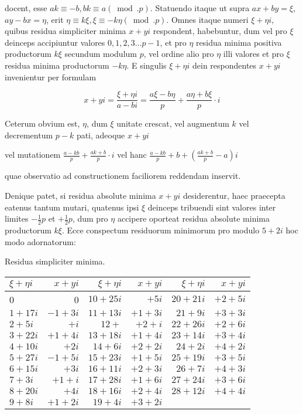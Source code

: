 \documentclass[10pt]{article}
\begin{document}
docent, esse \(a k \equiv-b, b k \equiv a(\bmod . p)\). Statuendo itaque ut supra \(a x+b y=\xi\),
\(a y-b x=\eta\), erit \(\eta \equiv k \xi, \xi \equiv-k \eta(\bmod . p)\). Omnes itaque numeri \(\xi+\eta i\), quibus residua simpliciter minima \(x+y i\) respondent, habebuntur, dum vel pro \(\xi\) deinceps accipiuntur valores \(0,1,2,3 \ldots p-1\), et pro \(\eta\) residua minima positiva productorum \(k \xi\) secundum modulum \(p\), vel ordine alio pro \(\eta\) illi valores et pro \(\xi\) residua minima productorum \(-k \eta\). E singulis \(\xi+\eta i\) dein respondentes \(x+y i\) invenientur per formulam

\[
x+y i=\frac{\xi+\eta i}{a-b i}=\frac{a \xi-b \eta}{p}+\frac{a \eta+b \xi}{p} \cdot i
\]

Ceterum obvium est, \(\eta\), dum \(\xi\) unitate crescat, vel augmentum \(k\) vel decrementum \(p-k\) pati, adeoque \(x+y i\)

vel mutationem \(\frac{a-k b}{p}+\frac{a k+b}{p} \cdot i\) vel hanc \(\frac{a-k b}{p}+b+\left(\frac{a k+b}{p}-a\right) i\)

quae observatio ad constructionem faciliorem reddendam inservit.

Denique patet, si residua absolute minima \(x+y i\) desiderentur, haec praecepta eatenus tantum mutari, quatenus ipsi \(\xi\) deinceps tribuendi sint valores inter limites \(-\frac{1}{2} p\) et \(+\frac{1}{2} p\), dum pro \(\eta\) accipere oporteat residua absolute minima productorum \(k \xi\). Ecce conspectum residuorum minimorum pro modulo \(5+2 i\) hoc modo adornatorum:

Residua simpliciter minima.

\begin{center}
\begin{tabular}{l|r|r|r|r|r}
\(\xi+\eta i\) & \(x+y i\) & \(\xi+\eta i\) & \(x+y i\) & \(\xi+\eta i\) & \(x+y i\) \\
\hline
0 & 0 & \(10+25 i\) & \(+5 i\) & \(20+21 i\) & \(+2+5 i\) \\
\(1+17 i\) & \(-1+3 i\) & \(11+13 i\) & \(+1+3 i\) & \(21+9 i\) & \(+3+3 i\) \\
\(2+5 i\) & \(+i\) & \(12+\) & \(+2+i\) & \(22+26 i\) & \(+2+6 i\) \\
\(3+22 i\) & \(+1+4 i\) & \(13+18 i\) & \(+1+4 i\) & \(23+14 i\) & \(+3+4 i\) \\
\(4+10 i\) & \(+2 i\) & \(14+6 i\) & \(+2+2 i\) & \(24+2 i\) & \(+4+2 i\) \\
\(5+27 i\) & \(-1+5 i\) & \(15+23 i\) & \(+1+5 i\) & \(25+19 i\) & \(+3+5 i\) \\
\(6+15 i\) & \(+3 i\) & \(16+11 i\) & \(+2+3 i\) & \(26+7 i\) & \(+4+3 i\) \\
\(7+3 i\) & \(+1+i\) & \(17+28 i\) & \(+1+6 i\) & \(27+24 i\) & \(+3+6 i\) \\
\(8+20 i\) & \(+4 i\) & \(18+16 i\) & \(+2+4 i\) & \(28+12 i\) & \(+4+4 i\) \\
\(9+8 i\) & \(+1+2 i\) & \(19+4 i\) & \(+3+2 i\) &  &  \\
\end{tabular}
\end{center}
\end{document}
